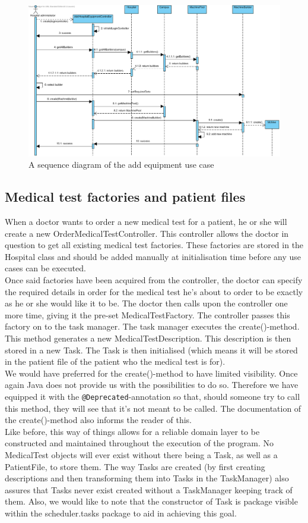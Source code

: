 \documentclass[12pt]{article}
\begin{document}
\begin{figure}[h!]
\includegraphics[width=170mm]{addequip.png}
\caption{A sequence diagram of the add equipment use case}
\label{addequipment}
\end{figure}

\subsection{Medical test factories and patient files}
When a doctor wants to order a new medical test for a patient, he or she will create a new OrderMedicalTestController. This controller allows the doctor in question to get all existing medical test factories. These factories are stored in the Hospital class and should be added manually at initialisation time before any use cases can be executed.\\
Once said factories have been acquired from the controller, the doctor can specify the required details in order for the medical test he's about to order to be exactly as he or she would like it to be. The doctor then calls upon the controller one more time, giving it the pre-set MedicalTestFactory. The controller passes this factory on to the task manager. The task manager executes the create()-method. This method generates a new MedicalTestDescription. This description is then stored in a new Task. The Task is then initialised (which means it will be stored in the patient file of the patient who the medical test is for).\\
We would have preferred for the create()-method to have limited visibility. Once again Java does not provide us with the possibilities to do so. Therefore we have equipped it with the \texttt{@Deprecated}-annotation so that, should someone try to call this method, they will see that it's not meant to be called. The documentation of the create()-method also informs the reader of this.\\
Like before, this way of things allows for a reliable domain layer to be constructed and maintained throughout the execution of the program. No MedicalTest objects will ever exist without there being a Task, as well as a PatientFile, to store them. The way Tasks are created (by first creating descriptions and then transforming them into Tasks in the TaskManager) also assures that Tasks never exist created without a TaskManager keeping track of them. Also, we would like to note that the constructor of Task is package visible within the scheduler.tasks package to aid in achieving this goal.
\end{document}
